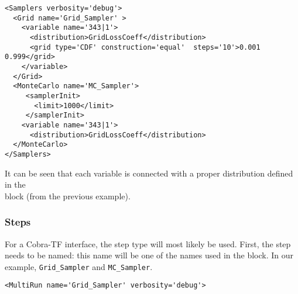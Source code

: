 \begin{lstlisting}[style=XML,morekeywords={name,type,construction,lowerBound,steps,limit,initialSeed}]
<Samplers verbosity='debug'>
  <Grid name='Grid_Sampler' >
    <variable name='343|1'>
      <distribution>GridLossCoeff</distribution>
      <grid type='CDF' construction='equal'  steps='10'>0.001 0.999</grid>
    </variable>
  </Grid>
  <MonteCarlo name='MC_Sampler'>
     <samplerInit>
       <limit>1000</limit>
     </samplerInit>
    <variable name='343|1'>
      <distribution>GridLossCoeff</distribution>
  </MonteCarlo>
</Samplers>
\end{lstlisting}

It can be seen that each variable is connected with a proper distribution
defined in the \\ block (from the previous example).

\subsubsection{Steps}
For a Cobra-TF interface, the  step type will most likely be
used.
%
First, the step needs to be named: this name will be one of the names used in
the  block.
%
In our example, \texttt{Grid\_Sampler} and \texttt{MC\_Sampler}.
%
\begin{lstlisting}[style=XML,morekeywords={name,debug,re-seeding}]
     <MultiRun name='Grid_Sampler' verbosity='debug'>
\end{lstlisting}

